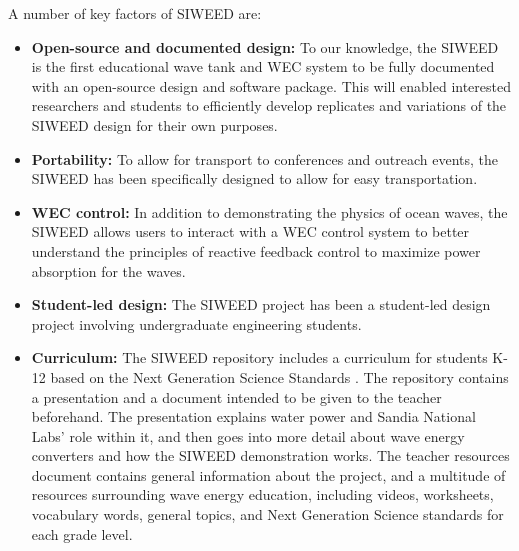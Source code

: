 \documentclass[11pt, letterpaper]{article}
\begin{document}

A number of key factors of SIWEED are:

\begin{itemize}
  \item \textbf{Open-source and documented design:} To our knowledge, the SIWEED is the first educational wave tank and WEC system to be fully documented with an open-source design and software package.
  This will enabled interested researchers and students to efficiently develop replicates and variations of the SIWEED design for their own purposes.
  \item \textbf{Portability:} To allow for transport to conferences and outreach events, the SIWEED has been specifically designed to allow for easy transportation.
  \item \textbf{WEC control:} In addition to demonstrating the physics of ocean waves, the SIWEED allows users to interact with a WEC control system to better understand the principles of reactive feedback control to maximize power absorption for the waves.
  \item \textbf{Student-led design:} The SIWEED project has been a student-led design project involving undergraduate engineering students.
  \item \textbf{Curriculum:} The SIWEED repository includes a curriculum for students K-12 based on the Next Generation Science Standards \cite{NextGenScience2021}. 
The repository contains a presentation and a document intended to be given to the teacher beforehand. 
The presentation explains water power and Sandia National Labs' role within it, and then goes into more detail about wave energy converters and how the SIWEED demonstration works.
The teacher resources document contains general information about the project, and a multitude of resources surrounding wave energy education, including videos, worksheets, vocabulary words, general topics, and Next Generation Science standards for each grade level.
\end{itemize}
\end{document}
